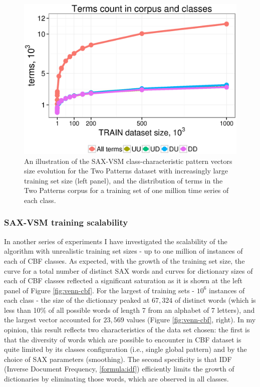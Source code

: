 \begin{figure}[t]
   \includegraphics[width=140mm]{figures/words-two-patterns.ps}
   \caption[An illustration of the SAX-VSM class-characteristic pattern vectors size evolution for the Two Patterns dataset 
   with increasingly large training set size.]{An illustration of the SAX-VSM class-characteristic pattern vectors size evolution for the Two Patterns dataset 
   with increasingly large training set size (left panel), and the distribution of terms in the Two Patterns corpus for 
   a training set of one million time series of each class.}
   \label{fig:venn-2p}
\end{figure}

\subsubsection{SAX-VSM training scalability}
In another series of experiments I have investigated the scalability of the algorithm with
unrealistic training set sizes - up to one million of instances of each of CBF classes.
As expected, with the growth of the training set size, the curve for a total number of distinct SAX
words and curves for dictionary sizes of each of CBF classes reflected a significant saturation 
as it is shown at the left panel of Figure \ref{fig:venn-cbf}. 
For the largest of training sets - $10^6$ instances of each class - the size of the dictionary peaked at $67,324$ 
of distinct words (which is less than 10\% of all possible words of length 7 from an alphabet of 7 letters), 
and the largest \tfidf vector accounted for $23,569$ values (Figure \ref{fig:venn-cbf}, right). 
In my opinion, this result reflects two characteristics of the data set chosen: the first is that the diversity of words which 
are possible to encounter in CBF dataset is quite limited by its classes configuration (i.e., single global 
pattern) and by the choice of SAX parameters (smoothing). 
The second specificity is that IDF (Inverse Document Frequency, \ref{formula:idf})
efficiently limits the growth of dictionaries by eliminating those words, which are observed in all
classes. 

